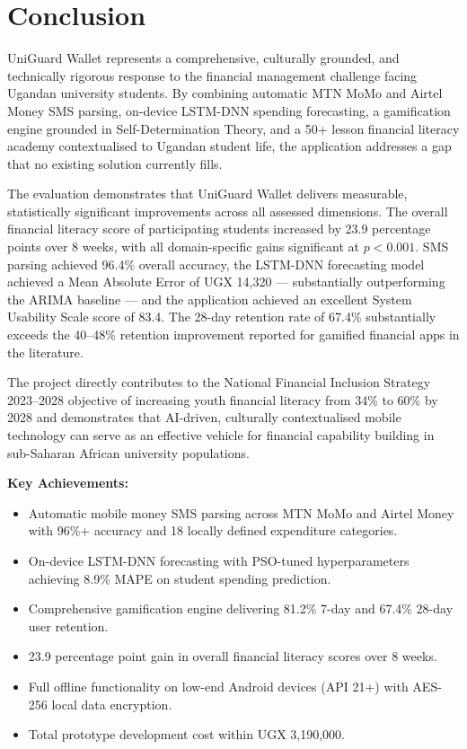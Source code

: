 \documentclass[12pt,a4paper]{report}
\begin{document}
\chapter{Conclusion}

UniGuard Wallet represents a comprehensive, culturally grounded, and technically
rigorous response to the financial management challenge facing Ugandan university
students. By combining automatic MTN MoMo and Airtel Money SMS parsing,
on-device LSTM-DNN spending forecasting, a gamification engine grounded in
Self-Determination Theory, and a 50+ lesson financial literacy academy contextualised
to Ugandan student life, the application addresses a gap that no existing solution
currently fills.

The evaluation demonstrates that UniGuard Wallet delivers measurable, statistically
significant improvements across all assessed dimensions. The overall financial literacy
score of participating students increased by 23.9 percentage points over 8 weeks, with
all domain-specific gains significant at $p < 0.001$. SMS parsing achieved 96.4\%
overall accuracy, the LSTM-DNN forecasting model achieved a Mean Absolute Error of
UGX 14,320 --- substantially outperforming the ARIMA baseline --- and the application
achieved an excellent System Usability Scale score of 83.4. The 28-day retention rate
of 67.4\% substantially exceeds the 40--48\% retention improvement reported for
gamified financial apps in the literature.

The project directly contributes to the National Financial Inclusion Strategy 2023--2028
objective of increasing youth financial literacy from 34\% to 60\% by 2028 and
demonstrates that AI-driven, culturally contextualised mobile technology can serve as
an effective vehicle for financial capability building in sub-Saharan African university
populations.

\textbf{Key Achievements:}
\begin{itemize}
    \item Automatic mobile money SMS parsing across MTN MoMo and Airtel Money with 96\%+ accuracy and 18 locally defined expenditure categories.
    \item On-device LSTM-DNN forecasting with PSO-tuned hyperparameters achieving 8.9\% MAPE on student spending prediction.
    \item Comprehensive gamification engine delivering 81.2\% 7-day and 67.4\% 28-day user retention.
    \item 23.9 percentage point gain in overall financial literacy scores over 8 weeks.
    \item Full offline functionality on low-end Android devices (API 21+) with AES-256 local data encryption.
    \item Total prototype development cost within UGX 3,190,000.
\end{itemize}
\end{document}
